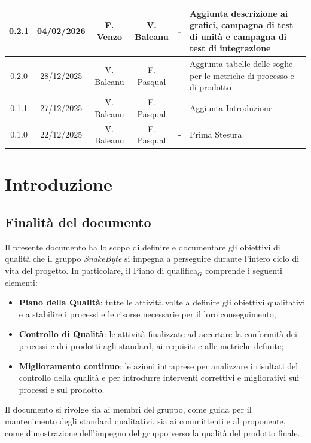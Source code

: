 \documentclass[10pt, letterpaper]{article}
\begin{document}
\begin{center}
\begin{tabularx}{\textwidth}{|c|c|c|c|c|X|}
        \hline
        0.2.1                                  & 04/02/2026    & F. Venzo        & V. Baleanu               & -                    & Aggiunta descrizione ai grafici, campagna di test di unità e campagna di test di integrazione \\
        \hline
        0.2.0                                  & 28/12/2025    & V. Baleanu      & F. Pasqual               & -                    & Aggiunta tabelle delle soglie per le metriche di processo e di prodotto                       \\
        \hline
        0.1.1                                  & 27/12/2025    & V. Baleanu      & F. Pasqual               & -                    & Aggiunta Introduzione                                                                         \\
        \hline
        0.1.0                                  & 22/12/2025    & V. Baleanu      & F. Pasqual               & -                    & Prima Stesura                                                                                 \\
        \hline
    \end{tabularx}
\end{center}

\newpage

\tableofcontents

\newpage
\listoffigures
\newpage
\listoftables
\newpage

\section{Introduzione}
\subsection{Finalità del documento}
Il presente documento ha lo scopo di definire e documentare gli obiettivi di qualità
che il gruppo \textit{SnakeByte} si impegna a perseguire durante l'intero ciclo di vita del
progetto. In particolare, il Piano di qualifica${_G}$ comprende i seguenti elementi:
\begin{itemize}
    \item \textbf{Piano della Qualità}: tutte le attività volte a definire gli obiettivi
          qualitativi e a stabilire i processi e le risorse necessarie per il loro conseguimento;
    \item \textbf{Controllo di Qualità}: le attività finalizzate ad accertare la conformità dei processi
          e dei prodotti agli standard, ai requisiti e alle metriche definite;
    \item \textbf{Miglioramento continuo}: le azioni intraprese per analizzare i risultati
          del controllo della qualità e per introdurre interventi correttivi e migliorativi
          sui processi e sul prodotto.
\end{itemize}
Il documento si rivolge sia ai membri del gruppo, come guida per il mantenimento
degli standard qualitativi, sia ai committenti e al proponente, come dimostrazione
dell'impegno del gruppo verso la qualità del prodotto finale.
\end{document}
